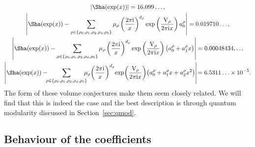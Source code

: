 \documentclass[pdftex]{sigma}
\numberwithin{equation}{section}
\def\VC{\mathrm{VC}}
\def\WRT{\Sha}
\def\VC{\mathrm{V}}
\begin{document}
\begin{gather*}
 \left|\WRT(\exp(x))\right|
  = 16.099\dots,\\
 \left|\WRT(\exp(x))-      \sum_{\rho\in\{\rho_0,\rho_1,\rho_2,\rho_4,\rho_5\}}\mu_{\rho}\left(\frac{2\pi {\rm i}}{x}\right)^{d_\rho}\exp\left(\frac{\VC_{\rho}}{2\pi {\rm i}x}\right)a_0^{\rho}\right|
  = 0.019710\dots,\\
 \left|\WRT(\exp(x))-      \sum_{\rho\in\{\rho_0,\rho_1,\rho_2,\rho_4,\rho_5\}}\mu_{\rho}\left(\frac{2\pi {\rm i}}{x}\right)^{d_\rho}\exp\left(\frac{\VC_{\rho}}{2\pi {\rm i}x}\right)\bigl(a_0^{\rho}+a_1^{\rho}x\bigr)\right|
  = 0.00048434,\dots\\
 \left|\WRT(\exp(x))-     \!\!\! \sum_{\rho\in\{\rho_0,\rho_1,\rho_2,\rho_4,\rho_5\}}\!\!\!\!\mu_{\rho}\!\left(\frac{2\pi {\rm i}}{x}\right)^{d_\rho}\!\exp\!\left(\frac{\VC_{\rho}}{2\pi {\rm i}x}\right)\!\bigl(a_0^{\rho}+a_1^{\rho}x+a_2^{\rho}x^2\bigr)\right|\!
  = 6.5311\ldots\times10^{-5}.
\end{gather*}
The form of these volume conjectures make them seem closely related. We will find that this is indeed the case and the best description is through quantum modularity discussed in Section~\ref{sec:qmod}.

\subsection{Behaviour of the coefficients}
\label{asympser}
\end{document}
